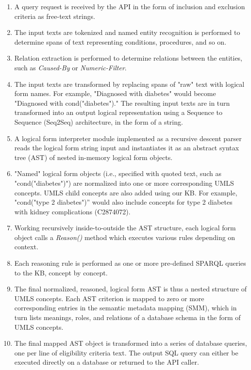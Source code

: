 \documentclass[../main.tex]{subfiles}
\begin{document}
\begin{enumerate}
    \item{A query request is received by the API in the form of inclusion and exclusion criteria as free-text strings.}
    \item{The input texts are tokenized and named entity recognition is performed to determine spans of text representing conditions, procedures, and so on.}
    \item{Relation extraction is performed to determine relations between the entities, such as \textit{Caused-By} or \textit{Numeric-Filter}.}
    \item{The input texts are transformed by replacing spans of "raw" text with logical form names. For example, "Diagnosed with diabetes" would become "Diagnosed with cond("diabetes")." The resulting input texts are in turn transformed into an output logical representation using a Sequence to Sequence (Seq2Seq) architecture, in the form of a string.}
    \item{A logical form interpreter module implemented as a recursive descent parser \cite{johnstone1998generalised} reads the logical form string input and instantiates it as an abstract syntax tree (AST) of nested in-memory logical form objects.}
    \item{"Named" logical form objects (i.e., specified with quoted text, such as "cond("diabetes")") are normalized into one or more corresponding UMLS concepts. UMLS child concepts are also added using our KB. For example, "cond("type 2 diabetes")” would also include concepts for type 2 diabetes with kidney complications (C2874072).}
    \item{Working recursively inside-to-outside the AST structure, each logical form object calls a \textit{Reason()} method which executes various rules depending on context.}
    \item{Each reasoning rule is performed as one or more pre-defined SPARQL queries to the KB, concept by concept.}
    \item{The final normalized, reasoned, logical form AST is thus a nested structure of UMLS concepts. Each AST criterion is mapped to zero or more corresponding entries in the semantic metadata mapping (SMM), which in turn lists meanings, roles, and relations of a database schema in the form of UMLS concepts.}
    \item{The final mapped AST object is transformed into a series of database queries, one per line of eligibility criteria text. The output SQL query can either be executed directly on a database or returned to the API caller.}
\end{enumerate}
\end{document}
